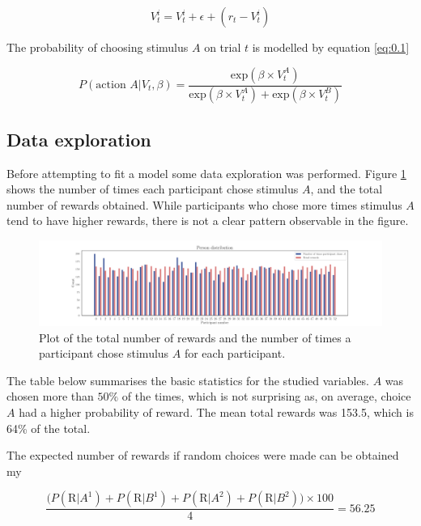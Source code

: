 \documentclass[12pt]{article}
\begin{document}
\begin{equation}
    V_t^i = V_t^i + \epsilon + (r_t - V_t^i)
    \label{eq:0.0}
\end{equation}

The probability of choosing stimulus $A$ on trial $t$ is modelled by equation \ref{eq:0.1}

\begin{equation}
    P(\text{action } A | V_t, \beta) = \frac{\mathrm{exp}(\beta \times V_t^A)}{\mathrm{exp}(\beta \times V_t^A) + \mathrm{exp}(\beta \times V_t^B)}
    \label{eq:0.1}
\end{equation}


\subsection{Data exploration}

Before attempting to fit a model some data exploration was performed. Figure \ref{fig:2.1} shows the number of times each participant chose stimulus $A$, and the total number of rewards obtained. While participants who chose more times stimulus $A$ tend to have higher rewards, there is not a clear pattern observable in the figure. 

\begin{figure}[h!]
	\centering
	\hspace*{-0.6in}
	\includegraphics[width=1.2\linewidth]{figures/2.1.pdf}
	\caption{Plot of the total number of rewards and the number of times a participant chose stimulus $A$ for each participant.}
	\label{fig:2.1}
\end{figure}

The table below summarises the basic statistics for the studied variables. $A$ was chosen more than $50\%$ of the times, which is not surprising as, on average, choice $A$ had a higher probability of reward. The mean total rewards was 153.5, which is 64\% of the total.

The expected number of rewards if random choices were made can be obtained my

\[ \frac{\big(P(\mathrm{R} | A^1) + P(\mathrm{R} | B^1) + P(\mathrm{R} | A^2) + P(\mathrm{R} | B^2)\big) \times 100}{4} = 56.25 \]
\end{document}

